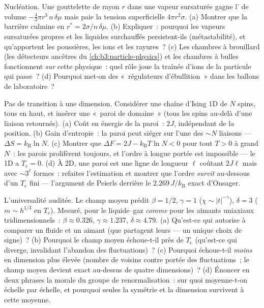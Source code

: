 \begin{exercise}[$\star\star$]\label{exo:b3:phase-transitions:9}
Nucléation. Une gouttelette de rayon $r$ dans une vapeur sursaturée
gagne l' de volume $-\tfrac43\pi r^3\,n\,\delta\mu$
mais paie la tension superficielle $4\pi r^2\sigma$. (a) Montrer que
la barrière culmine en $r^* = 2\sigma/n\,\delta\mu$. (b)
Expliquer~: pourquoi les vapeurs sursaturées propres et les liquides
surchauffés persistent-ils (métastabilité), et qu'apportent les
poussières, les ions et les rayures~? (c) Les chambres à brouillard
(les détecteurs ancêtres du \cref{ch:b3:particle-physics}) et les
chambres à bulles fonctionnent \emph{sur} cette physique~: quel rôle
joue la traînée d'ions de la particule qui passe~? (d) Pourquoi
met-on des «~régulateurs d'ébullition~» dans les ballons de
laboratoire~?
\end{exercise}

\begin{exercise}[$\star\star\star$]\label{exo:b3:phase-transitions:10}
Pas de transition à une dimension. Considérer une chaîne d'Ising 1D
de $N$ spins, tous en haut, et insérer une «~paroi de domaine~»
(tous les spins au-delà d'une liaison retournés). (a) Coût en
énergie de la paroi~: $2J$, indépendant de la position. (b) Gain
d'entropie~: la paroi peut siéger sur l'une des $\sim N$ liaisons
--- $\Delta S = k_{\text{B}}\ln N$. (c) Montrer que
$\Delta F = 2J - k_{\text{B}}T\ln N < 0$ pour tout $T > 0$ à grand
$N$~: les parois prolifèrent toujours, et l'ordre à longue portée
est impossible --- le  1D a $T_{\text{c}} = 0$. (d) À
2D, une paroi est une ligne de longueur $\ell$ coûtant $2J\ell$ mais
avec $\sim3^\ell$ formes~: refaites l'estimation et montrer que
l'ordre \emph{survit} au-dessous d'un $T_{\text{c}}$ fini ---
l'argument de Peierls derrière le $2.269\,J/k_{\text{B}}$ exact
d'Onsager.
\end{exercise}

\begin{exercise}[$\star\star\star$]\label{exo:b3:phase-transitions:11}
L'universalité auditée. Le champ moyen prédit $\beta = 1/2$, $\gamma
= 1$ ($\chi \sim |t|^{-\gamma}$), $\delta = 3$ ($m \sim h^{1/3}$
en $T_{\text{c}}$). Mesuré, pour le  liquide--gaz
\emph{comme} pour les aimants uniaxiaux tridimensionnels~: $\beta
\approx 0.326$, $\gamma \approx 1.237$, $\delta \approx 4.79$.
(a) Qu'est-ce qui autorise à comparer un fluide et un aimant (que
partagent leurs  --- un unique choix de signe)~?
(b) Pourquoi le champ moyen échoue-t-il près de $T_{\text{c}}$
(qu'est-ce qui diverge, invalidant l'abandon des fluctuations)~? (c)
Pourquoi échoue-t-il \emph{moins} en dimension plus élevée (nombre
de voisins contre portée des fluctuations~; le champ moyen devient
exact au-dessus de quatre dimensions)~? (d) Énoncer en deux phrases
la morale du groupe de renormalisation~: sur quoi moyenne-t-on
échelle par échelle, et pourquoi seules la symétrie et la dimension
survivent à cette moyenne.
\end{exercise}

